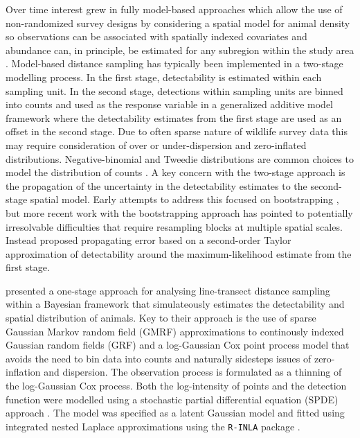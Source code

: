 \documentclass[preprint,12pt]{elsarticle}
\begin{document}
Over time interest grew in fully model-based approaches which allow the use of non-randomized survey designs by considering a spatial model for animal density so observations can be associated with spatially indexed covariates and abundance can, in principle, be estimated for any subregion within the study area \citep{johnson_model-based_2010, miller_spatial_2013, buckland_model-based_2016}.  Model-based distance sampling has typically been implemented in a two-stage modelling process.  In the first stage, detectability is estimated within each sampling unit.  In the second stage, detections within sampling units are binned into counts and used as the response variable in a generalized additive model framework where the detectability estimates from the first stage are used as an offset in the second stage.  Due to often sparse nature of wildlife survey data this may require consideration of over or under-dispersion and zero-inflated distributions.  Negative-binomial and Tweedie distributions are common choices to model the distribution of counts \citep{wood_gam_2017}.
A key concern with the two-stage approach is the propagation of the uncertainty in the detectability estimates to the second-stage spatial model.  Early attempts to address this focused on bootstrapping \citep{lahiri_resampling_2003}, but more recent work with the bootstrapping approach has pointed to potentially irresolvable difficulties that require resampling blocks at multiple spatial scales. Instead \cite{bravington_reliable_2018-1} proposed propagating error based on a second-order Taylor approximation of detectability around the maximum-likelihood estimate from the first stage.

\citet{yuan_point_2017} presented a one-stage approach for analysing line-transect distance sampling within a Bayesian framework that simulateously estimates the detectability 
and spatial distribution of animals.  Key to their approach is the use of sparse Gaussian Markov random field (GMRF) approximations to continously indexed Gaussian random fields (GRF) and a log-Gaussian Cox point process model that avoids the need to bin data into counts and naturally sidesteps issues of zero-inflation and dispersion.  The observation process is formulated as a thinning of the log-Gaussian Cox process.  Both the log-intensity of points and the detection function were modelled using a stochastic partial differential equation (SPDE) approach \citep{lindgren_explicit_2011}.  The model was specified as a latent Gaussian model and fitted using integrated nested Laplace approximations using the \texttt{R-INLA} package \citep{rue_approximate_2009}.  
\end{document}
